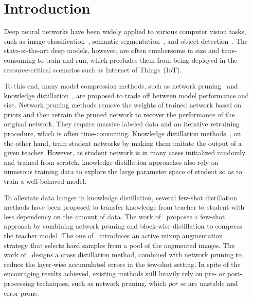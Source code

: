 \documentclass[letterpaper]{article} %
\begin{document}
\section{Introduction}
{
    Deep neural networks have been widely applied 
    to various computer vision tasks, such as image
    classification~\cite{krizhevsky2012imagenet,simonyan2014very,szegedy2015going,he2016deep}, 
    semantic segmentation~\cite{long2015fully,chen2018deeplab,badrinarayananK17}, 
    and object detection~\cite{ren2015faster,liu2016ssd,zhang2018single}.
    The state-of-the-art deep models, however, 
    are often cumbersome in size
    and time-consuming to train and run, 
    which precludes them from being deployed in
    the resource-critical scenarios such as Internet of Things~(IoT).

    To this end, many model compression methods, such as network pruning~\cite{li2016pruning,han2015learning,wen2016learning} 
    and knowledge distillation~\cite{hinton2015distilling,romero2015fitnets}, 
    are proposed to trade off between model performance and size.
    Network pruning methods remove the weights of trained network
    based on  priors and then retrain the pruned network to recover
    the performance of the original network. 
    They require massive labeled data and an
    iterative retraining procedure, which is often time-consuming.
    Knowledge distillation methods~\cite{hinton2015distilling},
    on the other hand, {train student networks
    by making them imitate} the output of a given teacher.
    However, as student network is in many cases initialized randomly 
    and trained from scratch, 
    knowledge distillation approaches also rely on
    numerous training data to explore 
    the large parameter space of student so as to train a well-behaved model. 
   

    To alleviate data hunger in knowledge distillation, 
    several few-shot distillation methods have been proposed 
    to transfer knowledge from teacher to student 
    with less dependency on the amount of data.
    The work of~\cite{li2018few} proposes a few-shot approach by 
    combining network pruning and block-wise 
    distillation to compress the teacher model.
    The one of~\cite{wang2020neural} introduces 
    an active mixup augmentation strategy that
    selects hard samples from a pool of the augmented images. 
    The work of~\cite{bai2019few} designs a 
    cross distillation method, combined 
    with network pruning to reduce the layer-wise
    accumulated errors in the few-shot setting.
    In spite of the encouraging results achieved,
    existing methods still heavily rely 
    on pre- or post-processing techniques,
    such as network pruning,
    which {\emph{per se}} are unstable and error-prone.
    
}
\end{document}
